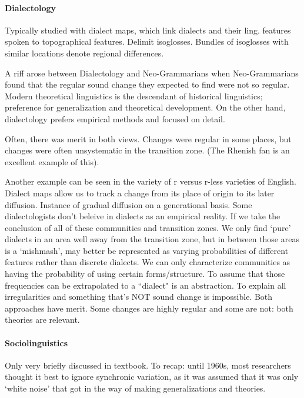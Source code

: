 \documentclass{exam}
\begin{document}
\paragraph{Dialectology}Typically studied with dialect maps, which link dialects and their ling. features spoken to topographical features. Delimit isoglosses. Bundles of isoglosses with similar locations denote regional differences. 

A riff arose between Dialectology and Neo-Grammarians when Neo-Grammarians found that the regular sound change they expected to find were not so regular. Modern theoretical linguistics is the descendant of historical linguistics; preference for generalization and theoretical development. On the other hand, dialectology prefers empirical methods and focused on detail. 



Often, there was merit in both views. Changes were regular in some places, but changes were often unsystematic in the transition zone. (The Rhenish fan is an excellent example of this). 

Another example can be seen in the variety of r versus r-less varieties of English. Dialect maps allow us to track a change from its place of origin to its later diffusion. Instance of gradual diffusion on a generational basis. Some dialectologists don't beleive in dialects as an empirical reality. If we take the conclusion of all of these communities and transition zones. We only find `pure' dialects in an area well away from the transition zone, but in between those areas is a `mishmash', may better be represented as varying probabilities of different features rather than discrete dialects. We can only characterize communities as having the probability of using certain forms/structure. To assume that those frequencies can be extrapolated to a ``dialect" is an abstraction. To explain all irregularities and something that's NOT sound change is impossible. Both approaches have merit. Some changes are highly regular and some are not: both theories are relevant. 

\paragraph*{Sociolinguistics} Only very briefly discussed in textbook. To recap: until 1960s, most researchers thought it best to ignore synchronic variation, as it was assumed that it was only `white noise' that got in the way of making generalizations and theories. 
\end{document}
